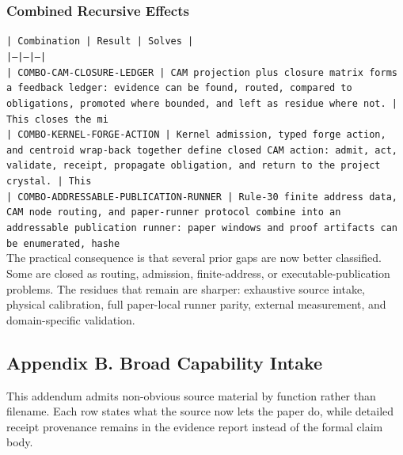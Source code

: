 \documentclass[11pt]{article}
\begin{document}
\subsubsection*{Combined Recursive Effects}

\noindent\texttt{| Combination | Result | Solves |}\\
\noindent\texttt{|---|---|---|}\\
\noindent\texttt{| COMBO-CAM-CLOSURE-LEDGER | CAM projection plus closure matrix forms a feedback ledger: evidence can be found, routed, compared to obligations, promoted where bounded, and left as residue where not. | This closes the mi}\\
\noindent\texttt{| COMBO-KERNEL-FORGE-ACTION | Kernel admission, typed forge action, and centroid wrap-back together define closed CAM action: admit, act, validate, receipt, propagate obligation, and return to the project crystal. | This}\\
\noindent\texttt{| COMBO-ADDRESSABLE-PUBLICATION-RUNNER | Rule-30 finite address data, CAM node routing, and paper-runner protocol combine into an addressable publication runner: paper windows and proof artifacts can be enumerated, hashe}\\

The practical consequence is that several prior gaps are now better classified. Some are closed as routing, admission, finite-address, or executable-publication problems. The residues that remain are sharper: exhaustive source intake, physical calibration, full paper-local runner parity, external measurement, and domain-specific validation.

\subsection*{Appendix B. Broad Capability Intake}

This addendum admits non-obvious source material by function rather than filename. Each row states what the source now lets the paper do, while detailed receipt provenance remains in the evidence report instead of the formal claim body.
\end{document}

